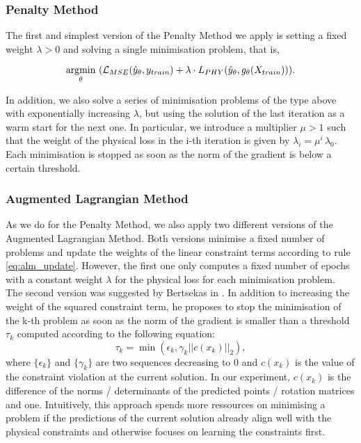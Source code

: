 \subsubsection{Penalty Method}
The first and simplest version of the Penalty Method we apply is setting a fixed weight $\lambda > 0$ and solving a single minimisation problem, that is,

\[\underset{\theta}{\operatorname*{argmin}} \,\, (\mathcal{L}_{MSE}(\hat{y}_\theta, y_{train}) + \lambda \cdot L_{PHY}(\hat{y}_\theta, g_\theta(X_{train}))).\]

In addition, we also solve a series of minimisation problems of the type above with exponentially increasing $\lambda$, but using the solution of the last iteration as a warm start for the next one. In particular, we introduce a multiplier $\mu > 1$ such that the weight of the physical loss in the i-th iteration is given by $\lambda_i = \mu^i \, \lambda_0$. Each minimisation is stopped as soon as the norm of the gradient is below a certain threshold.

\subsubsection{Augmented Lagrangian Method}
\label{exp:alm}
As we do for the Penalty Method, we also apply two different versions of the Augmented Lagrangian Method. Both versions minimise a fixed number of problems and update the weights of the linear constraint terms according to rule \eqref{eq:alm_update}. However, the first one only computes a fixed number of epochs with a constant weight $\lambda$ for the physical loss for each minimisation problem.\\
\indent The second version was suggested by Bertsekas in \cite{Yurkiewicz1985ConstrainedOA}. In addition to increasing the weight of the squared constraint term, he proposes to stop the minimisation of the k-th problem as soon as the norm of the gradient is smaller than a threshold $\tau_k$ computed according to the following equation:
\[\tau_k = \min(\epsilon_k, \gamma_k ||c(x_k)||_2), \]
where $\{\epsilon_k\}$ and $\{\gamma_k \}$ are two sequences decreasing to 0 and $c(x_k)$ is the value of the constraint violation at the current solution. In our experiment, $c(x_k)$ is the difference of the norms / determinants of the predicted points / rotation matrices and one. Intuitively, this approach spends more ressources on minimising a problem if the predictions of the current solution already align well with the physical constraints and otherwise focuses on learning the constraints first.

